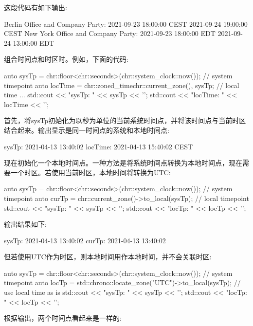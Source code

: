 这段代码有如下输出:

\begin{shell}
Berlin Office and Company Party:
  2021-09-23 18:00:00 CEST
  2021-09-24 19:00:00 CEST
New York Office and Company Party:
  2021-09-23 18:00:00 EDT
  2021-09-24 13:00:00 EDT
\end{shell}

组合时间点和时区时。例如，下面的代码:

\begin{cpp}
auto sysTp = chr::floor<chr::seconds>(chr::system_clock::now()); // system timepoint
auto locTime = chr::zoned_time{chr::current_zone(), sysTp}; // local time
...
std::cout << "sysTp:         " << sysTp << '\n';
std::cout << "locTime:       " << locTime << '\n';
\end{cpp}

首先，将sysTp初始化为以秒为单位的当前系统时间点，并将该时间点与当前时区结合起来。输出显示是同一时间点的系统和本地时间点:

\begin{shell}
sysTp:      2021-04-13 13:40:02
locTime:    2021-04-13 15:40:02 CEST
\end{shell}

现在初始化一个本地时间点。一种方法是将系统时间点转换为本地时间点，现在需要一个时区。若使用当前时区，本地时间将转换为UTC:

\begin{cpp}
auto sysTp = chr::floor<chr::seconds>(chr::system_clock::now()); // system timepoint
auto curTp = chr::current_zone()->to_local(sysTp); // local timepoint
std::cout << "sysTp:            " << sysTp << '\n';
std::cout << "locTp:            " << locTp << '\n';
\end{cpp}

输出结果如下:

\begin{shell}
sysTp:     2021-04-13 13:40:02
curTp:     2021-04-13 13:40:02
\end{shell}

但若使用UTC作为时区，则本地时间用作本地时间，并不会关联时区:

\begin{cpp}
auto sysTp = chr::floor<chr::seconds>(chr::system_clock::now()); // system timepoint
auto locTp = std::chrono::locate_zone("UTC")->to_local(sysTp); // use local time as is
std::cout << "sysTp:              " << sysTp << '\n';
std::cout << "locTp:              " << locTp << '\n';
\end{cpp}

根据输出，两个时间点看起来是一样的:

